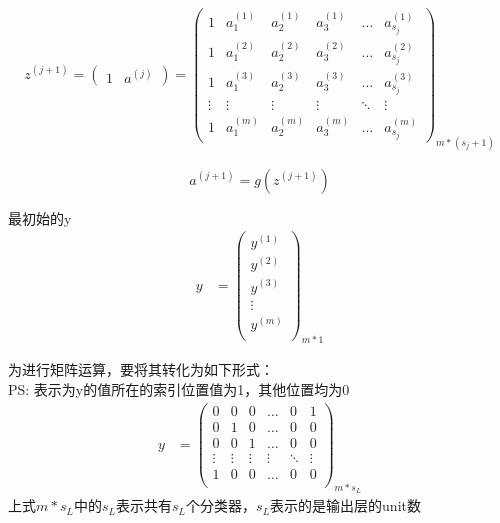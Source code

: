 \begin{equation}\begin{aligned}
	z^{(j+1)} = \left(\begin{matrix} 1 & a^{(j)} \end{matrix}\right)
	= \left( \begin{matrix}
			1 & a_1^{(1)} & a_2^{(1)} & a_3^{(1)} & \dots & a_{s_j}^{(1)} \\
			1 & a_1^{(2)} & a_2^{(2)} & a_3^{(2)} & \dots & a_{s_j}^{(2)} \\
			1 & a_1^{(3)} & a_2^{(3)} & a_3^{(3)} & \dots & a_{s_j}^{(3)} \\
			\vdots & \vdots    & \vdots    & \vdots    & \ddots & \vdots   \\
			1 & a_1^{(m)} & a_2^{(m)} & a_3^{(m)} & \dots & a_{s_j}^{(m)}
		\end{matrix}\right)_{m*(s_j+1)}
\end{aligned}\end{equation}

\begin{equation}
	a^{(j+1)} = g(z^{(j+1)})
\end{equation}

最初始的y
\begin{equation} \begin{aligned}
	y & = \left(\begin{matrix}
			y^{(1)} \\ y^{(2)} \\ y^{(3)} \\ \vdots \\ y^{(m)} \\
		\end{matrix}\right)_{m*1}
\end{aligned} \end{equation}

为进行矩阵运算，要将其转化为如下形式：\\
PS: 表示为y的值所在的索引位置值为1，其他位置均为0
\begin{equation}\begin{aligned}
	y &= \left(\begin{matrix}
	        0 & 0 & 0 & \dots & 0 & 1 \\
	        0 & 1 & 0 & \dots & 0 & 0 \\
	        0 & 0 & 1 & \dots & 0 & 0 \\
	        \vdots & \vdots & \vdots & \vdots & \ddots & \vdots \\
	        1 & 0 & 0 & \dots & 0 & 0 \\
		\end{matrix}\right)_{m*s_L}
\end{aligned}\end{equation}
上式$m*s_L$中的$s_L$表示共有$s_L$个分类器，$s_L$表示的是输出层的unit数




